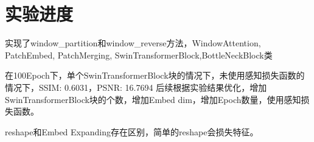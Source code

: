 \documentclass[a4paper, 10pt]{article}
\begin{document}
	\section{实验进度}
		实现了window\_partition和window\_reverse方法，WindowAttention, PatchEmbed, PatchMerging, SwinTransformerBlock,BottleNeckBlock类
		
		
		在100Epoch下，单个SwinTransformerBlock块的情况下，未使用感知损失函数的情况下，SSIM: 0.6031，PSNR: 16.7694
		后续根据实验结果优化，增加SwinTransformerBlock块的个数，增加Embed dim，增加Epoch数量，使用感知损失函数。
		
		reshape和Embed Expanding存在区别，简单的reshape会损失特征。
	
		\renewcommand{\refname}{References}
		
		
			
			
			
			
			
			
		
		
		
		
		
	
\end{document}
